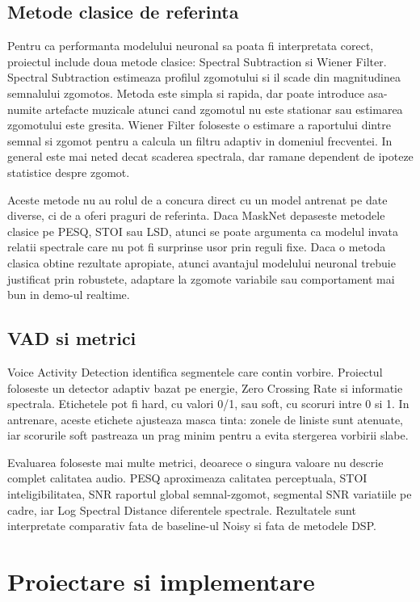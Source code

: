 \documentclass[12pt,a4paper]{report}
\begin{document}
\section{Metode clasice de referinta}

Pentru ca performanta modelului neuronal sa poata fi interpretata corect,
proiectul include doua metode clasice: Spectral Subtraction si Wiener Filter.
Spectral Subtraction estimeaza profilul zgomotului si il scade din magnitudinea
semnalului zgomotos. Metoda este simpla si rapida, dar poate introduce asa-numite
artefacte muzicale atunci cand zgomotul nu este stationar sau estimarea
zgomotului este gresita. Wiener Filter foloseste o estimare a raportului dintre
semnal si zgomot pentru a calcula un filtru adaptiv in domeniul frecventei. In
general este mai neted decat scaderea spectrala, dar ramane dependent de
ipoteze statistice despre zgomot.

Aceste metode nu au rolul de a concura direct cu un model antrenat pe date
diverse, ci de a oferi praguri de referinta. Daca MaskNet depaseste metodele
clasice pe PESQ, STOI sau LSD, atunci se poate argumenta ca modelul invata
relatii spectrale care nu pot fi surprinse usor prin reguli fixe. Daca o metoda
clasica obtine rezultate apropiate, atunci avantajul modelului neuronal trebuie
justificat prin robustete, adaptare la zgomote variabile sau comportament mai
bun in demo-ul realtime.

\section{VAD si metrici}

Voice Activity Detection identifica segmentele care contin vorbire. Proiectul
foloseste un detector adaptiv bazat pe energie, Zero Crossing Rate si informatie
spectrala. Etichetele pot fi hard, cu valori 0/1, sau soft, cu scoruri intre 0
si 1. In antrenare, aceste etichete ajusteaza masca tinta: zonele de liniste
sunt atenuate, iar scorurile soft pastreaza un prag minim pentru a evita
stergerea vorbirii slabe.

Evaluarea foloseste mai multe metrici, deoarece o singura valoare nu descrie
complet calitatea audio. PESQ aproximeaza calitatea perceptuala, STOI
inteligibilitatea, SNR raportul global semnal-zgomot, segmental SNR variatiile
pe cadre, iar Log Spectral Distance diferentele spectrale. Rezultatele sunt
interpretate comparativ fata de baseline-ul Noisy si fata de metodele DSP.

\chapter{Proiectare si implementare}
\end{document}
